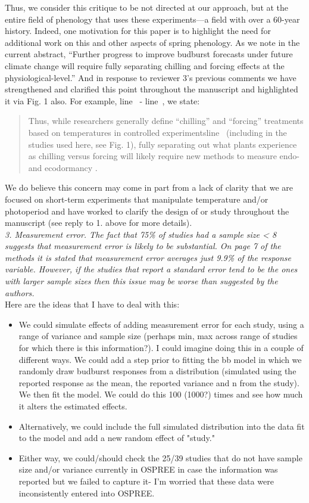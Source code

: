 \documentclass[11pt, a4paper]{article}
\newcommand{\lr}[1]{line~\lineref{#1}}
\begin{document}
Thus, we consider this critique to be not directed at our approach, but at the entire field of phenology that uses these experiments---a field with over a 60-year history. Indeed, one motivation for this paper is to highlight the need for additional work on this and other aspects of spring phenology. As we note in the current abstract, ``Further progress to improve budburst forecasts under future climate change will require fully separating chilling and forcing effects at the physiological-level.'' And in response to reviewer 3's previous comments we have strengthened and clarified this point throughout the manuscript and highlighted it via Fig. 1 also. For example, \lr{whatchillstart} - \lr{whatchillend}, we state:
\begin{quote}
Thus, while researchers generally define ``chilling'' and ``forcing'' treatments based on temperatures in controlled experiments\lr{ee7} (including in the studies used here, see Fig. 1), fully separating out what plants experience as chilling versus forcing will likely require new methods to measure endo- and ecodormancy \emph{\citep{vanderschoot2014}}. 
\end{quote}
We do believe this concern may come in part from a lack of clarity that we are focused on short-term experiments that manipulate temperature and/or photoperiod and have worked to clarify the design of or study throughout the manuscript (see reply to 1. above for more details).\\

\emph{3. Measurement error. The fact that 75\% of studies had a sample size < 8 suggests that
measurement error is likely to be substantial. On page 7 of the methods it is stated that
measurement error averages just 9.9\% of the response variable. However, if the studies that
report a standard error tend to be the ones with larger sample sizes then this issue may be
worse than suggested by the authors.}\\

Here are the ideas that I have to deal with this:
\begin{itemize}
\item  We could simulate effects of adding measurement error for each study, using a range of variance and sample size (perhaps min, max across range of studies for which there is this information?). I could imagine doing this in a couple of different ways. We could add a step prior to fitting the bb model in which we randomly draw budburst responses from a distribution (simulated using the reported response as the mean, the reported variance and n from the study). We then fit the model. We could do this 100 (1000?) times and see how much it alters the estimated effects. 
\item Alternatively, we could include the full simulated distribution into the data fit to the model and add a new random effect of "study."  
\item Either way, we could/should check the 25/39 studies that do not have sample size and/or variance currently in OSPREE in case the information was reported but we failed to capture it- I'm worried that these data were inconsistently entered into OSPREE. 
\end{itemize}
\end{document}
